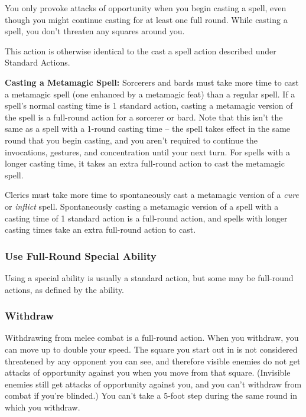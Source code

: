 You only provoke attacks of opportunity when you begin casting a spell, even though 
you might continue casting for at least one full round. While casting a spell, 
you don't threaten any squares around you.

This action is otherwise identical to the cast a spell action described under Standard 
Actions.

\textbf{Casting a Metamagic Spell:} Sorcerers and bards must take more time to 
cast a metamagic spell (one enhanced by a metamagic feat) than a regular spell. 
If a spell's normal casting time is 1 standard action, casting a metamagic version 
of the spell is a full-round action for a sorcerer or bard. Note that this isn't 
the same as a spell with a 1-round casting time -- the spell takes effect in the 
same round that you begin casting, and you aren't required to continue the invocations, 
gestures, and concentration until your next turn. For spells with a longer casting 
time, it takes an extra full-round action to cast the metamagic spell.

Clerics must take more time to spontaneously cast a metamagic version of a \textit{cure}
or \textit{inflict} spell. Spontaneously casting a metamagic version 
of a spell with a casting time of 1 standard action is a full-round action, and 
spells with longer casting times take an extra full-round action to cast.

\subsubsection{Use Full-Round Special Ability}

Using a special ability is usually a standard action, but some may be full-round 
actions, as defined by the ability.

\subsubsection{Withdraw}

Withdrawing from melee combat is a full-round action. When you withdraw, you can 
move up to double your speed. The square you start out in is not considered threatened 
by any opponent you can see, and therefore visible enemies do not get attacks of 
opportunity against you when you move from that square. (Invisible enemies still 
get attacks of opportunity against you, and you can't withdraw from combat if you're 
blinded.) You can't take a 5-foot step during the same round in which you withdraw.

